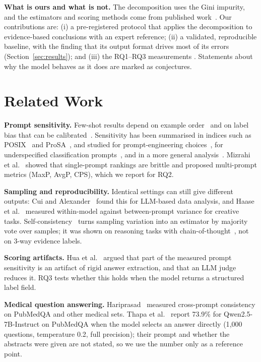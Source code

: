 \documentclass[conference]{IEEEtran}
\begin{document}
\noindent\textbf{What is ours and what is not.} The decomposition uses the
Gini impurity, and the estimators and scoring methods come from published
work~\cite{wang2023selfconsistency,mizrahi2024state,hua2025flaw}. Our
contributions are: (i) a pre-registered protocol that applies the
decomposition to evidence-based conclusions with an expert reference; (ii)
a validated, reproducible baseline, with the finding that its output
format drives most of its errors (Section~\ref{sec:results}); and (iii)
the RQ1--RQ3 measurements . Statements about why the
model behaves as it does are marked as conjectures.

\section{Related Work}
\textbf{Prompt sensitivity.} Few-shot results depend on example
order~\cite{lu2022fantastically} and on label bias that can be
calibrated~\cite{zhao2021calibrate}. Sensitivity has been summarised in
indices such as POSIX~\cite{chatterjee2024posix} and
ProSA~\cite{zhuo2024prosa}, and studied for prompt-engineering
choices~\cite{errica2025what}, for underspecified classification
prompts~\cite{pecher2026revisiting}, and in a more general
analysis~\cite{liu2026understanding}. Mizrahi et
al.~\cite{mizrahi2024state} showed that single-prompt rankings are
brittle and proposed multi-prompt metrics (MaxP, AvgP, CPS), which we
report for RQ2.

\textbf{Sampling and reproducibility.} Identical settings can still give
different outputs: Cui and Alexander~\cite{cui2026same} found this for
LLM-based data analysis, and Haase et al.~\cite{haase2026within} measured
within-model against between-prompt variance for creative tasks.
Self-consistency~\cite{wang2023selfconsistency} turns sampling variation
into an estimator by majority vote over samples; it was shown on
reasoning tasks with chain-of-thought~\cite{wei2022chain}, not on 3-way
evidence labels.

\textbf{Scoring artifacts.} Hua et al.~\cite{hua2025flaw} argued that part
of the measured prompt sensitivity is an artifact of rigid answer
extraction, and that an LLM judge reduces it. RQ3 tests whether this holds
when the model returns a structured label field.

\textbf{Medical question answering.} Hariprasad~\cite{hariprasad2026prompt}
measured cross-prompt consistency on PubMedQA and other medical sets.
Thapa et al.~\cite{thapa2025disentangling} report 73.9\% for
Qwen2.5-7B-Instruct on PubMedQA when the model selects an answer directly
(1{,}000 questions, temperature 0.2, full precision); their prompt and
whether the abstracts were given are not stated, so we use the number only
as a reference point.
\end{document}
